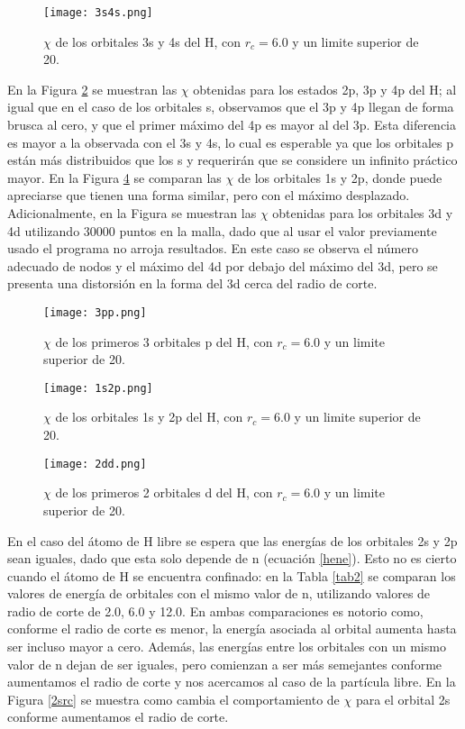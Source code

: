 \documentclass[12pt,a4paper]{report}
\begin{document}
\begin{figure}[h]
\centering
\texttt{[image: 3s4s.png]}
\caption{$\chi$ de los orbitales 3s y 4s del H, con $r_c=6.0$ y un limite superior de 20.\label{3s4s}}
\end{figure}

En la Figura \ref{3pp} se muestran las $\chi$ obtenidas para los estados 2p, 3p y 4p del H; al igual que en el caso de los orbitales s, observamos que el 3p y 4p llegan de forma brusca al cero, y que el primer máximo del 4p es mayor al del 3p. Esta diferencia es mayor a la observada con el 3s y 4s, lo cual es esperable ya que los orbitales p están más distribuidos que los s y requerirán que se considere un infinito práctico mayor. En la Figura \ref{1s2p} se comparan las $\chi$ de los orbitales 1s y 2p, donde puede apreciarse que tienen una forma similar, pero con el máximo desplazado. Adicionalmente, en la Figura se muestran las $\chi$ obtenidas para los orbitales 3d y 4d utilizando 30000 puntos en la malla, dado que al usar el valor previamente usado el programa no arroja resultados. En este caso se observa el número adecuado de nodos y el máximo del 4d por debajo del máximo del 3d, pero se presenta una distorsión en la forma del 3d cerca del radio de corte.

\begin{figure}[h]
\centering
\texttt{[image: 3pp.png]}
\caption{$\chi$ de los primeros 3 orbitales p del H, con $r_c=6.0$ y un limite superior de 20.\label{3pp}}
\end{figure}

\begin{figure}[h]
\centering
\texttt{[image: 1s2p.png]}
\caption{$\chi$ de los orbitales 1s y 2p del H, con $r_c=6.0$ y un limite superior de 20.\label{1s2p}}
\end{figure}


\begin{figure}[h]
\centering
\texttt{[image: 2dd.png]}
\caption{$\chi$ de los primeros 2 orbitales d del H, con $r_c=6.0$ y un limite superior de 20.\label{1s2p}}
\end{figure}


En el caso del átomo de H libre se espera que las energías de los orbitales 2s y 2p sean iguales, dado que esta solo depende de n (ecuación \ref{hene}). Esto no es cierto cuando el átomo de H se encuentra confinado: en la Tabla \ref{tab2} se comparan los valores de energía de orbitales con el mismo valor de n, utilizando valores de radio de corte de 2.0, 6.0 y 12.0. En ambas comparaciones es notorio como, conforme el radio de corte es menor, la energía asociada al orbital aumenta hasta ser incluso mayor a cero. Además, las energías entre los orbitales con un mismo valor de n dejan de ser iguales, pero comienzan a ser más semejantes conforme aumentamos el radio de corte y nos acercamos al caso de la partícula libre. En la Figura \ref{2src} se muestra como cambia el comportamiento de $\chi$ para el orbital 2s conforme aumentamos el radio de corte. 
\end{document}
